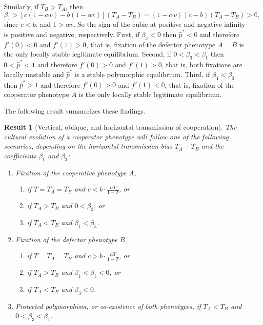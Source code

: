 \documentclass[12pt]{extarticle}
\newtheorem{result}{Result}
\begin{document}
{Similarly, if $T_B>T_A$, then
\begin{equation} \label{eq:beta1_rev}
   \beta_1 > [c(1-\alpha v) - b(1-\alpha v)] (T_A-T_B) 
   = (1-\alpha v)(c-b)(T_A-T_B) > 0,
 \end{equation}
since $c<b$, and $1>\alpha v$. So the sign of the cubic at positive and negative infinity is positive and negative, respectively. 
First, if $\beta_3<0$ then $\hat{p}^*<0$ and therefore $f'(0)<0$ and $f'(1)>0$, that is, fixation of the defector phenotype $A=B$ is the only locally stable legitimate equilibrium.
Second, if $0<\beta_3<\beta_1$ then $0<\hat{p}^*<1$ and therefore $f'(0)>0$ and $f'(1)>0$, that is, both fixations are locally unstable and $\hat{p}^*$ is a stable polymorphic equilibrium.
Third, if $\beta_1<\beta_3$ then $\hat{p}^*>1$ and therefore $f'(0)>0$ and $f'(1)<0$, that is, fixation of the cooperator phenotype $A$ is the only locally stable legitimate equilibrium.

The following result summarizes these findings.

\begin{result}[Vertical, oblique, and horizontal transmission of cooperation]
The cultural evolution of a cooperator phenotype will follow one of the following scenarios, depending on the horizontal transmission bias $T_A-T_B$ and the coefficients $\beta_1$ and $\beta_3$:
\begin{enumerate}
\item \emph{Fixation of the cooperative phenotype $A$}, 
\begin{enumerate}
\item if $T=T_A=T_B$ and $c < b\cdot \frac{\alpha T}{1-T}$, or
\item if $T_A>T_B$ and $0<\beta_3$, or 
\item if $T_A<T_B$ and $\beta_1<\beta_3$.
\end{enumerate}

\item \emph{Fixation of the defector phenotype $B$}, 
\begin{enumerate}
\item if $T=T_A=T_B$ and $c > b\cdot \frac{\alpha T}{1-T}$, or 
\item if $T_A>T_B$ and $\beta_1<\beta_3<0$, or 
\item if $T_A<T_B$ and $\beta_3<0$.
\end{enumerate}

\item \emph{Protected polymorphism, or co-existence of both phenotypes}, if $T_A < T_B$ and $0<\beta_3<\beta_1$.


\end{enumerate}
\end{result}}
\end{document}
